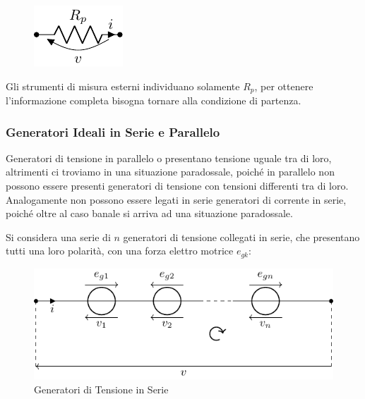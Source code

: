 \documentclass{article}
\numberwithin{equation}{subsection}
\begin{document}
\begin{figure}[H]%
    \centering
    \includegraphics{resistori-parallelo-equivalente.pdf}
    \label{fig:resistori-parallelo-equivalente}
\end{figure}

Gli strumenti di misura esterni individuano solamente $R_p$, per ottenere l'informazione completa bisogna tornare alla condizione di partenza. 

\subsubsection{Generatori Ideali in Serie e Parallelo}

Generatori di tensione in parallelo o presentano tensione uguale tra di loro, altrimenti ci troviamo in una situazione paradossale, poiché in parallelo non possono essere presenti 
generatori di tensione con tensioni differenti tra di loro. Analogamente non possono essere legati in serie generatori di corrente in serie, poiché oltre al caso banale si 
arriva ad una situazione paradossale. 


Si considera una serie di $n$ generatori di tensione collegati in serie, che presentano tutti una loro polarità, con una forza elettro motrice $e_{gk}$:  
\begin{figure}[H]%
    \centering
    \includegraphics{generatore-tensione-serie.pdf}
    \caption{Generatori di Tensione in Serie}
    \label{fig:generatori-tensione-serie}
\end{figure}
\end{document}
